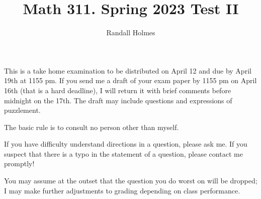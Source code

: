 \documentclass[12pt]{article}
\title{Math 311. Spring 2023 Test II}
\author{Randall Holmes}
\begin{document}
\maketitle

This is a take home examination to be distributed on April 12 and due by April 19th at 1155 pm.  If you send me a draft of your exam paper by 1155 pm on April 16th (that is a hard deadline), I will return it with brief comments before midnight on the 17th.  The draft may include questions and expressions of puzzlement.

The basic rule is to consult no person other than myself.

If you have difficulty understand directions in a question, please ask me.  If you suspect that there is a typo in the statement of a question, please contact me promptly!

You may assume at the outset that the question you do worst on will be dropped;  I may make further adjustments to grading depending on class performance.
\end{document}
